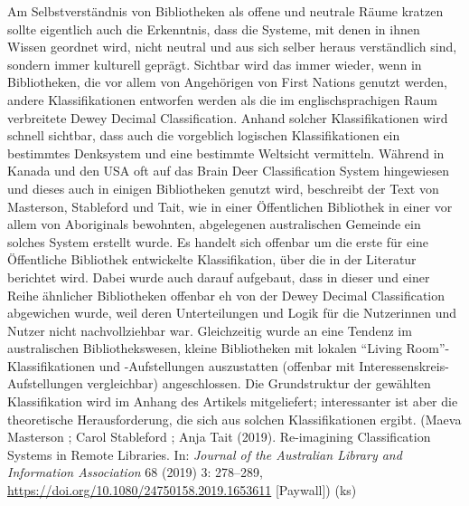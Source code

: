 \documentclass[a4paper,
fontsize=11pt,
oneside,
numbers=noperiodatend,
parskip=half-,
bibliography=totoc,
final
]{scrartcl}
\begin{document}
Am Selbstverständnis von Bibliotheken als offene und neutrale Räume
kratzen sollte eigentlich auch die Erkenntnis, dass die Systeme, mit
denen in ihnen Wissen geordnet wird, nicht neutral und aus sich selber
heraus verständlich sind, sondern immer kulturell geprägt. Sichtbar wird
das immer wieder, wenn in Bibliotheken, die vor allem von Angehörigen
von First Nations genutzt werden, andere Klassifikationen entworfen
werden als die im englischsprachigen Raum verbreitete Dewey Decimal
Classification. Anhand solcher Klassifikationen wird schnell sichtbar,
dass auch die vorgeblich logischen Klassifikationen ein bestimmtes
Denksystem und eine bestimmte Weltsicht vermitteln. Während in Kanada
und den USA oft auf das Brain Deer Classification System hingewiesen und
dieses auch in einigen Bibliotheken genutzt wird, beschreibt der Text
von Masterson, Stableford und Tait, wie in einer Öffentlichen Bibliothek
in einer vor allem von Aboriginals bewohnten, abgelegenen australischen
Gemeinde ein solches System erstellt wurde. Es handelt sich offenbar um
die erste für eine Öffentliche Bibliothek entwickelte Klassifikation,
über die in der Literatur berichtet wird. Dabei wurde auch darauf
aufgebaut, dass in dieser und einer Reihe ähnlicher Bibliotheken
offenbar eh von der Dewey Decimal Classification abgewichen wurde, weil
deren Unterteilungen und Logik für die Nutzerinnen und Nutzer nicht
nachvollziehbar war. Gleichzeitig wurde an eine Tendenz im australischen
Bibliothekswesen, kleine Bibliotheken mit lokalen \enquote{Living
Room}-Klassifikationen und -Aufstellungen auszustatten (offenbar mit
Interessenskreis-Aufstellungen vergleichbar) angeschlossen. Die
Grundstruktur der gewählten Klassifikation wird im Anhang des Artikels
mitgeliefert; interessanter ist aber die theoretische Herausforderung,
die sich aus solchen Klassifikationen ergibt. (Maeva Masterson ; Carol
Stableford ; Anja Tait (2019). Re-imagining Classification Systems in
Remote Libraries. In: \emph{Journal of the Australian Library and
Information Association} 68 (2019) 3: 278--289,
\url{https://doi.org/10.1080/24750158.2019.1653611} {[}Paywall{]}) (ks)
\end{document}
